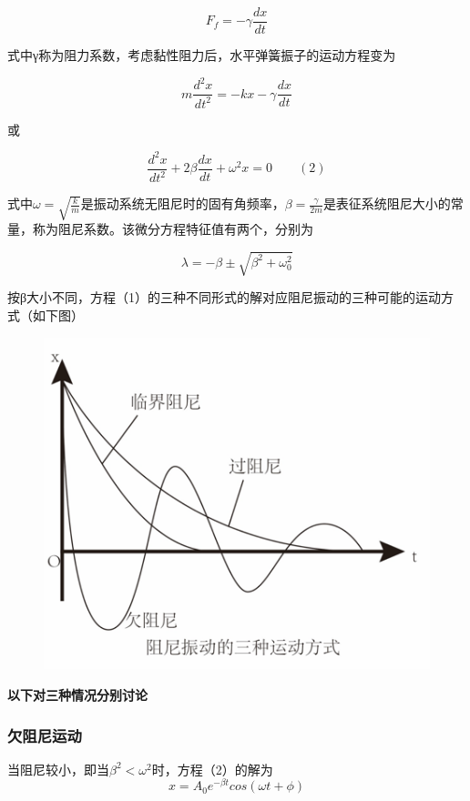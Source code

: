 \documentclass[12pt,a4paper]{ctexart}
\begin{document}
	$$F_f=-\gamma\frac{dx}{dt}$$
	
	式中γ称为阻力系数，考虑黏性阻力后，水平弹簧振子的运动方程变为
	
	$$m\frac{d^2x}{dt^2}=-kx-\gamma\frac{dx}{dt}$$
	
	或
	
	$$\frac{d^2 x}{dt^2}+2\beta\frac{dx}{dt}+\omega^2 x=0  \qquad(2)$$
	
	式中$\omega= \sqrt{\frac{k}{m}}$是振动系统无阻尼时的固有角频率，$\beta=\frac{\gamma}{2m}$是表征系统阻尼大小的常量，称为阻尼系数。该微分方程特征值有两个，分别为
	
	$$\lambda=-\beta \pm\sqrt{\beta^2+\omega_0^2}$$
	
	按β大小不同，方程（1）的三种不同形式的解对应阻尼振动的三种可能的运动方式（如下图）
	
	
	
	
\begin{figure}[h] %
	\centering %
	\includegraphics[scale=0.6]{T14.PNG} %
\end{figure}%
	
	\noindent\textbf{以下对三种情况分别讨论}
	\subsubsection{欠阻尼运动}
	当阻尼较小，即当$\beta^2<\omega^2$时，方程（2）的解为
	$$x=A_0e^{-\beta t}cos(\omega t+\phi)$$
	
\end{document}
